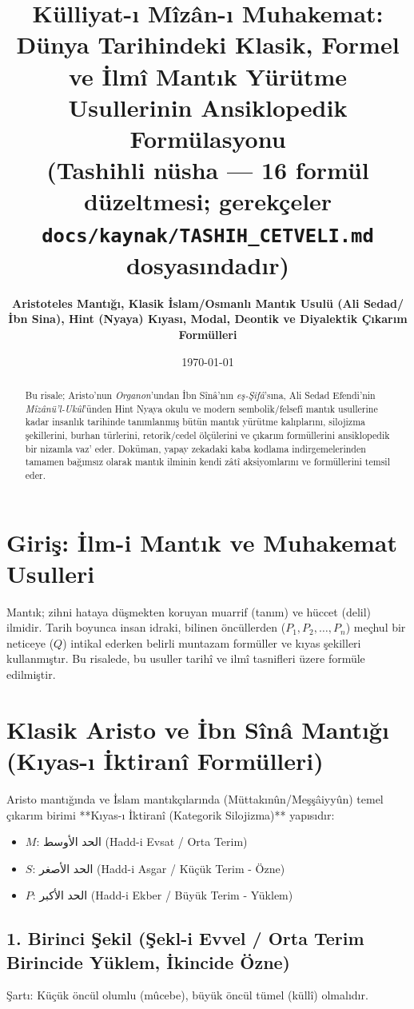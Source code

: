 \documentclass[11pt, a4paper]{article}
\title{\textbf{Külliyat-ı Mîzân-ı Muhakemat: Dünya Tarihindeki Klasik, Formel ve İlmî Mantık Yürütme Usullerinin Ansiklopedik Formülasyonu}\\ \normalsize\textmd{(Tashihli nüsha --- 16 formül düzeltmesi; gerekçeler \texttt{docs/kaynak/TASHIH\_CETVELI.md} dosyasındadır)}}
\author{\textbf{Aristoteles Mantığı, Klasik İslam/Osmanlı Mantık Usulü (Ali Sedad/İbn Sina), Hint (Nyaya) Kıyası, Modal, Deontik ve Diyalektik Çıkarım Formülleri}}
\date{\today}
\begin{document}
\maketitle

\begin{abstract}
Bu risale; Aristo'nun \textit{Organon}'undan İbn Sînâ'nın \textit{eş-Şifâ}'sına, Ali Sedad Efendi'nin \textit{Mîzânü'l-Ukûl}'ünden Hint Nyaya okulu ve modern sembolik/felsefî mantık usullerine kadar insanlık tarihinde tanımlanmış bütün mantık yürütme kalıplarını, silojizma şekillerini, burhan türlerini, retorik/cedel ölçülerini ve çıkarım formüllerini ansiklopedik bir nizamla vaz' eder. Doküman, yapay zekadaki kaba kodlama indirgemelerinden tamamen bağımsız olarak mantık ilminin kendi zâtî aksiyomlarını ve formüllerini temsil eder.
\end{abstract}

\tableofcontents
\newpage

\section{Giriş: İlm-i Mantık ve Muhakemat Usulleri}

Mantık; zihni hataya düşmekten koruyan muarrif (tanım) ve hüccet (delil) ilmidir. Tarih boyunca insan idraki, bilinen öncüllerden ($P_1, P_2, \dots, P_n$) meçhul bir neticeye ($Q$) intikal ederken belirli muntazam formüller ve kıyas şekilleri kullanmıştır. Bu risalede, bu usuller tarihî ve ilmî tasnifleri üzere formüle edilmiştir.

\section{Klasik Aristo ve İbn Sînâ Mantığı (Kıyas-ı İktiranî Formülleri)}

Aristo mantığında ve İslam mantıkçılarında (Müttakınûn/Meşşâiyyûn) temel çıkarım birimi **Kıyas-ı İktiranî (Kategorik Silojizma)** yapısıdır:
\begin{itemize}
    \item $M$: الحد الأوسط (Hadd-i Evsat / Orta Terim)
    \item $S$: الحد الأصغر (Hadd-i Asgar / Küçük Terim - Özne)
    \item $P$: الحد الأكبر (Hadd-i Ekber / Büyük Terim - Yüklem)
\end{itemize}

\subsection{1. Birinci Şekil (Şekl-i Evvel / Orta Terim Birincide Yüklem, İkincide Özne)}
Şartı: Küçük öncül olumlu (mûcebe), büyük öncül tümel (küllî) olmalıdır.
\end{document}
